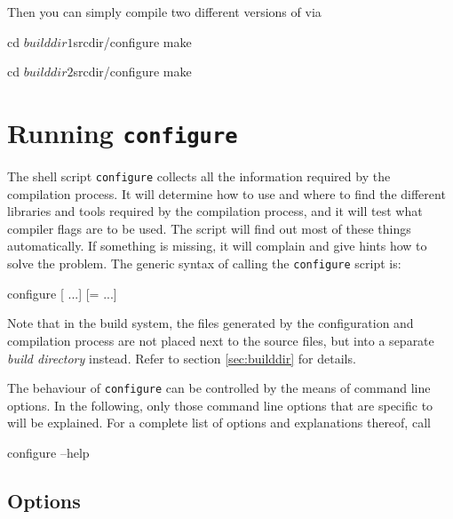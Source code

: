 \noindent Then you can simply compile two different versions of \es via
\begin{code}
cd $builddir1
$srcdir/configure
make

cd $builddir2
$srcdir/configure
make
\end{code}


\section{Running \texttt{configure}}
\label{sec:configure}


 The shell script \texttt{configure} collects all the
information required by the compilation process. It will determine how
to use and where to find the different libraries and tools required by
the compilation process, and it will test what compiler flags are to
be used.  The script will find out most of these things automatically.
If something is missing, it will complain and give hints how to solve
the problem.  The generic syntax of calling the \texttt{configure}
script is:
\begin{code}
configure [ ...] [= ...]
\end{code}

\noindent Note that in the \es build system, the files generated by
the configuration and compilation process are not placed next to the
source files, but into a separate \emph{build directory} instead.
Refer to section \vref{sec:builddir} for details.

 The behaviour of \texttt{configure} can be
controlled by the means of command line options. In the following,
only those command line options that are specific to \es will be
explained.  For a complete list of options and explanations thereof,
call
\begin{code}
configure --help
\end{code}

\subsection{Options}


